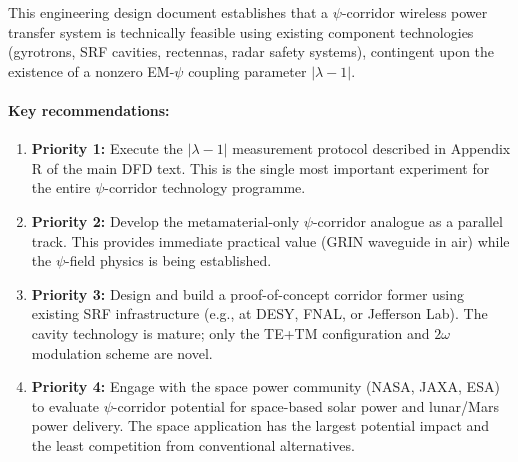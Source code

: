 \documentclass[11pt,a4paper]{article}
\begin{document}
This engineering design document establishes that a $\psi$-corridor wireless
power transfer system is technically feasible using existing component
technologies (gyrotrons, SRF cavities, rectennas, radar safety systems),
contingent upon the existence of a nonzero EM-$\psi$ coupling parameter
$|\lambda - 1|$.

\paragraph{Key recommendations:}
\begin{enumerate}
\item \textbf{Priority 1:} Execute the $|\lambda - 1|$ measurement protocol
described in Appendix R of the main DFD text. This is the single most
important experiment for the entire $\psi$-corridor technology programme.

\item \textbf{Priority 2:} Develop the metamaterial-only $\psi$-corridor
analogue as a parallel track. This provides immediate practical value
(GRIN waveguide in air) while the $\psi$-field physics is being established.

\item \textbf{Priority 3:} Design and build a proof-of-concept corridor
former using existing SRF infrastructure (e.g., at DESY, FNAL, or
Jefferson Lab). The cavity technology is mature; only the TE+TM
configuration and $2\omega$ modulation scheme are novel.

\item \textbf{Priority 4:} Engage with the space power community
(NASA, JAXA, ESA) to evaluate $\psi$-corridor potential for space-based
solar power and lunar/Mars power delivery. The space application has
the largest potential impact and the least competition from conventional
alternatives.
\end{enumerate}
\end{document}
